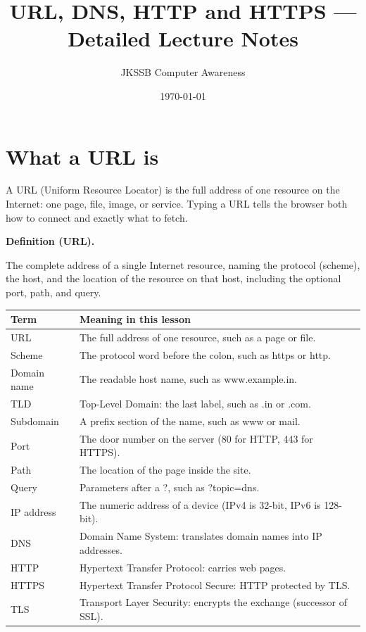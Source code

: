 \documentclass[11pt]{article}
\title{URL, DNS, HTTP and HTTPS --- Detailed Lecture Notes}
\author{JKSSB Computer Awareness}
\date{\today}
\newenvironment{definitionbox}[1]{%
  \par\noindent\textbf{Definition (#1).}\ \itshape
}{\par\vspace{0.3em}}
\begin{document}
\maketitle

\section{What a URL is}
A URL (Uniform Resource Locator) is the full address of one resource on the
Internet: one page, file, image, or service. Typing a URL tells the browser
both how to connect and exactly what to fetch.

\begin{definitionbox}{URL}
The complete address of a single Internet resource, naming the protocol
(scheme), the host, and the location of the resource on that host,
including the optional port, path, and query.
\end{definitionbox}

\begin{center}
\begin{tabular}{p{}p{}}
\toprule
\textbf{Term} & \textbf{Meaning in this lesson} \\
\midrule
URL & The full address of one resource, such as a page or file. \\
Scheme & The protocol word before the colon, such as https or http. \\
Domain name & The readable host name, such as www.example.in. \\
TLD & Top-Level Domain: the last label, such as .in or .com. \\
Subdomain & A prefix section of the name, such as www or mail. \\
Port & The door number on the server (80 for HTTP, 443 for HTTPS). \\
Path & The location of the page inside the site. \\
Query & Parameters after a ?, such as ?topic=dns. \\
IP address & The numeric address of a device (IPv4 is 32-bit, IPv6 is 128-bit). \\
DNS & Domain Name System: translates domain names into IP addresses. \\
HTTP & Hypertext Transfer Protocol: carries web pages. \\
HTTPS & Hypertext Transfer Protocol Secure: HTTP protected by TLS. \\
TLS & Transport Layer Security: encrypts the exchange (successor of SSL). \\
\bottomrule
\end{tabular}
\end{center}
\end{document}

